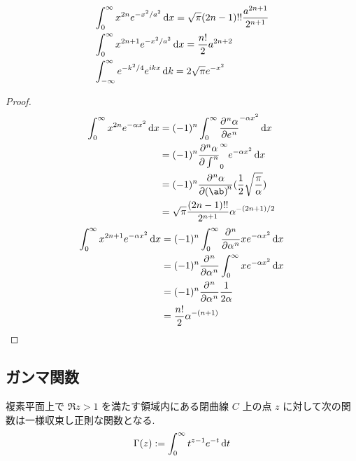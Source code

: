 \documentclass[uplatex,diffipdfmx,a4paper,11pt]{jlreq}
\begin{document}
\begin{theorem}[Gauss 積分]
  \begin{align}
     & \int_0^{\infty}x^{2n}e^{-x^2/a^2}\dl{x} = \sqrt{\pi}(2n - 1)!!\frac{a^{2n + 1}}{2^{n+1}} \\
     & \int_0^{\infty}x^{2n + 1}e^{-x^2/a^2}\dl{x} = \frac{n!}{2}a^{2n + 2}                     \\
     & \int_{-\infty}^{\infty}e^{-k^2/4}e^{ikx}\dl{k} = 2\sqrt{\pi}e^{-x^2}
  \end{align}
\end{theorem}
\begin{proof}
  \begin{align}
    \int_0^{\infty} x^{2n}e^{-\alpha x^2}\dl{x} & = (-1)^n\int_0^{\infty} \diffp[n]{\alpha}e^{-\alpha x^2}\dl{x}     \\
                                                & = (-1)^n\diffp[n]{\alpha}\int_0^{\infty} e^{-\alpha x^2}\dl{x}     \\
                                                & = (-1)^n\diffp[n]{\alpha}\ab(\frac{1}{2}\sqrt{\frac{\pi}{\alpha}}) \\
                                                & = \sqrt{\pi}\frac{(2n - 1)!!}{2^{n+1}}\alpha^{-(2n + 1)/2}
  \end{align}
  \begin{align}
    \int_0^{\infty} x^{2n + 1}e^{-\alpha x^2}\dl{x} & = (-1)^n\int_0^{\infty}\diffp[n]{}{\alpha}xe^{-\alpha x^2}\dl{x} \\
                                                    & = (-1)^n\diffp[n]{}{\alpha}\int_0^{\infty}xe^{-\alpha x^2}\dl{x} \\
                                                    & = (-1)^n\diffp[n]{}{\alpha}\frac{1}{2\alpha}                     \\
                                                    & = \frac{n!}{2}\alpha^{-(n + 1)}
  \end{align}
\end{proof}

\subsection{ガンマ関数}
\begin{definition}
  複素平面上で $\Re z > 1$ を満たす領域内にある閉曲線 $C$ 上の点 $z$ に対して次の関数は一様収束し正則な関数となる.
  \begin{align}
    \Gamma(z) := \int_0^\infty t^{z-1}e^{-t}\dl{t}
  \end{align}
\end{definition}
\end{document}
